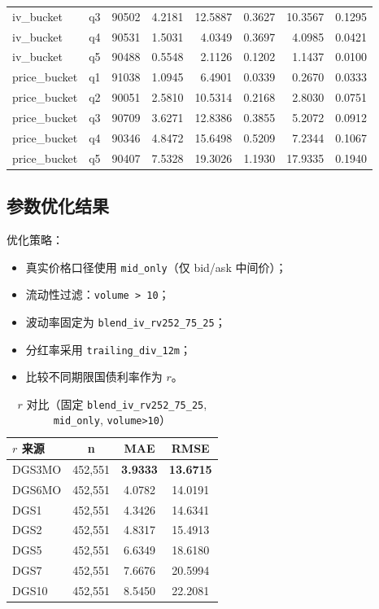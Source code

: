 \documentclass[11pt]{article}
\begin{document}
\begin{longtable}{llrrrrrr}
iv\_bucket & q3 & 90502 & 4.2181 & 12.5887 & 0.3627 & 10.3567 & 0.1295 \\
iv\_bucket & q4 & 90531 & 1.5031 & 4.0349 & 0.3697 & 4.0985 & 0.0421 \\
iv\_bucket & q5 & 90488 & 0.5548 & 2.1126 & 0.1202 & 1.1437 & 0.0100 \\
price\_bucket & q1 & 91038 & 1.0945 & 6.4901 & 0.0339 & 0.2670 & 0.0333 \\
price\_bucket & q2 & 90051 & 2.5810 & 10.5314 & 0.2168 & 2.8030 & 0.0751 \\
price\_bucket & q3 & 90709 & 3.6271 & 12.8386 & 0.3855 & 5.2072 & 0.0912 \\
price\_bucket & q4 & 90346 & 4.8472 & 15.6498 & 0.5209 & 7.2344 & 0.1067 \\
price\_bucket & q5 & 90407 & 7.5328 & 19.3026 & 1.1930 & 17.9335 & 0.1940 \\
\bottomrule
\end{longtable}
\endgroup

\subsection{参数优化结果}

优化策略：
\begin{itemize}
  \item 真实价格口径使用 \texttt{mid\_only}（仅 bid/ask 中间价）；
  \item 流动性过滤：\texttt{volume > 10}；
  \item 波动率固定为 \texttt{blend\_iv\_rv252\_75\_25}；
  \item 分红率采用 \texttt{trailing\_div\_12m}；
  \item 比较不同期限国债利率作为 $r$。
\end{itemize}

\begin{table}[H]
  \centering
  \begin{tabular}{lccc}
    \toprule
    $r$ 来源 & n & MAE & RMSE \\
    \midrule
    DGS3MO & 452,551 & \textbf{3.9333} & \textbf{13.6715} \\
    DGS6MO & 452,551 & 4.0782 & 14.0191 \\
    DGS1   & 452,551 & 4.3426 & 14.6341 \\
    DGS2   & 452,551 & 4.8317 & 15.4913 \\
    DGS5   & 452,551 & 6.6349 & 18.6180 \\
    DGS7   & 452,551 & 7.6676 & 20.5994 \\
    DGS10  & 452,551 & 8.5450 & 22.2081 \\
    \bottomrule
  \end{tabular}
  \caption{$r$ 对比（固定 \texttt{blend\_iv\_rv252\_75\_25}, \texttt{mid\_only}, \texttt{volume>10}）}
\end{table}
\end{document}
